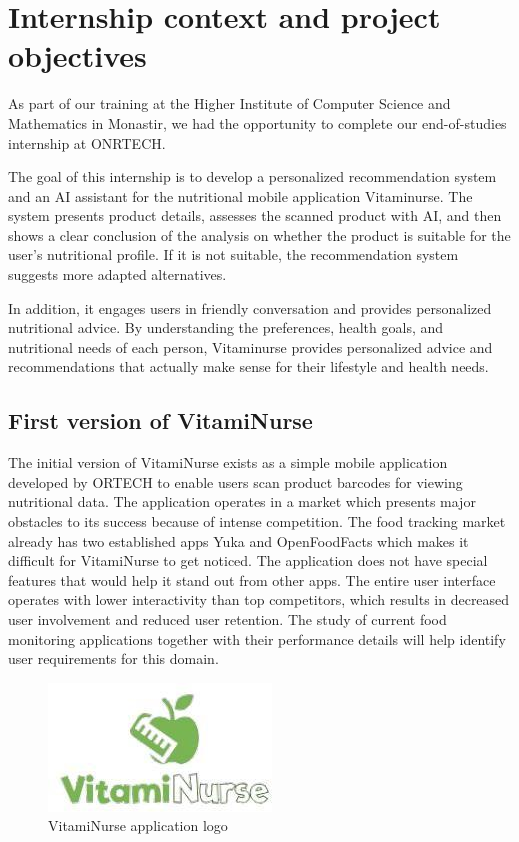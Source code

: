 \newpage
\section{Internship context and project objectives}
As part of our training at the Higher Institute of Computer Science and Mathematics in Monastir, we had the opportunity to complete our end-of-studies internship at ONRTECH.

 The goal of this internship is to develop a personalized recommendation system and an AI assistant for the nutritional mobile application Vitaminurse. 
 The system presents product details, assesses the scanned product with AI, and then shows a clear conclusion of the analysis on whether the product is suitable for the user’s nutritional profile. 
 If it is not suitable, the recommendation system suggests more adapted alternatives.

In addition, it engages users in friendly conversation and provides personalized nutritional advice. By understanding the preferences, health goals, and nutritional needs of each person, Vitaminurse provides personalized advice and recommendations that actually make sense for their lifestyle and health needs. 
\subsection{First version of VitamiNurse}
The initial version of VitamiNurse exists as a simple mobile application developed by ORTECH  to enable users scan product barcodes for viewing nutritional data. The application operates in a market which presents major obstacles to its success because of intense competition. The food tracking market already has two established apps Yuka and OpenFoodFacts which makes it difficult for VitamiNurse to get noticed. The application does not have special features that would help it stand out from other apps. The entire user interface operates with lower interactivity than top competitors, which results in decreased user involvement and reduced user retention. The study of current food monitoring applications together with their performance details will help identify user requirements for this domain.

\begin{center}
\begin{figure}[ht]
            \centering
            \includegraphics[scale=0.59]{images/VN_app_logo.png}
            \caption{VitamiNurse application logo}            
            \label{fig:VN_app_logo}
        \end{figure}
\end{center}


